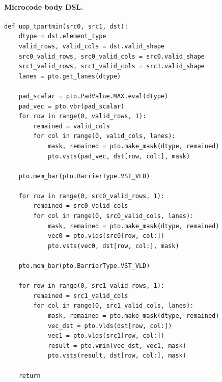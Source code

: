 \paragraph{Microcode body DSL.}
\begin{lstlisting}[style=ptocode]
def uop_tpartmin(src0, src1, dst):
    dtype = dst.element_type
    valid_rows, valid_cols = dst.valid_shape
    src0_valid_rows, src0_valid_cols = src0.valid_shape
    src1_valid_rows, src1_valid_cols = src1.valid_shape
    lanes = pto.get_lanes(dtype)

    pad_scalar = pto.PadValue.MAX.eval(dtype)
    pad_vec = pto.vbr(pad_scalar)
    for row in range(0, valid_rows, 1):
        remained = valid_cols
        for col in range(0, valid_cols, lanes):
            mask, remained = pto.make_mask(dtype, remained)
            pto.vsts(pad_vec, dst[row, col:], mask)

    pto.mem_bar(pto.BarrierType.VST_VLD)

    for row in range(0, src0_valid_rows, 1):
        remained = src0_valid_cols
        for col in range(0, src0_valid_cols, lanes):
            mask, remained = pto.make_mask(dtype, remained)
            vec0 = pto.vlds(src0[row, col:])
            pto.vsts(vec0, dst[row, col:], mask)

    pto.mem_bar(pto.BarrierType.VST_VLD)

    for row in range(0, src1_valid_rows, 1):
        remained = src1_valid_cols
        for col in range(0, src1_valid_cols, lanes):
            mask, remained = pto.make_mask(dtype, remained)
            vec_dst = pto.vlds(dst[row, col:])
            vec1 = pto.vlds(src1[row, col:])
            result = pto.vmin(vec_dst, vec1, mask)
            pto.vsts(result, dst[row, col:], mask)

    return
\end{lstlisting}
\Needspace{0.34\textheight}

